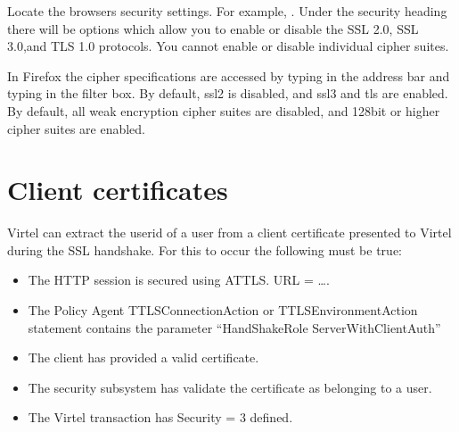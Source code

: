 \documentclass[letterpaper,10pt,english]{sphinxmanual}
\begin{document}
\sphinxAtStartPar
Locate the browsers security settings. For example, . Under the security heading there will be options which allow you to enable or disable the SSL 2.0, SSL 3.0,and TLS 1.0 protocols. You cannot enable or disable individual cipher suites.

\sphinxAtStartPar
In Firefox the cipher specifications are accessed by typing  in the address bar and typing  in the filter box. By default, ssl2 is disabled, and ssl3 and tls are enabled. By default, all weak encryption cipher suites are disabled, and 128\sphinxhyphen{}bit or higher cipher suites are enabled.

\ignorespaces 

\section{Client certificates}
\label{\detokenize{connectivity_guide:client-certificates}}\label{\detokenize{connectivity_guide:index-167}}
\sphinxAtStartPar
Virtel can extract the userid of a user from a client certificate presented to Virtel during the SSL handshake. For this to occur the following must be true:\sphinxhyphen{}
\begin{itemize}
\item {} 
\sphinxAtStartPar
The HTTP session is secured using AT\sphinxhyphen{}TLS. URL = ….

\item {} 
\sphinxAtStartPar
The Policy Agent TTLSConnectionAction or TTLSEnvironmentAction statement contains the parameter “HandShakeRole ServerWithClientAuth”

\item {} 
\sphinxAtStartPar
The client has provided a valid certificate.

\item {} 
\sphinxAtStartPar
The security subsystem has validate the certificate as belonging to a user.

\item {} 
\sphinxAtStartPar
The Virtel transaction has Security = 3 defined.

\end{itemize}
\end{document}
